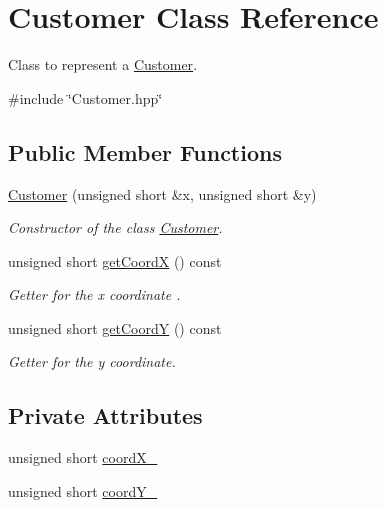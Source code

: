 \hypertarget{classCustomer}{\section{\-Customer \-Class \-Reference}
\label{classCustomer}
}


\-Class to represent a {\ttfamily \hyperlink{classCustomer}{\-Customer}}.  




{\ttfamily \#include \char`\"{}\-Customer.\-hpp\char`\"{}}

\subsection*{\-Public \-Member \-Functions}
\begin{DoxyCompactItemize}
\item 
\hyperlink{classCustomer_ab28c913ea5290b363f0b4157c483e0d6}{\-Customer} (unsigned short \&x, unsigned short \&y)
\begin{DoxyCompactList}\small\item\em \-Constructor of the class {\ttfamily \hyperlink{classCustomer}{\-Customer}}. \end{DoxyCompactList}\item 
unsigned short \hyperlink{classCustomer_abe89000bd8a0fc722b0322a4c9f4a6ad}{get\-Coord\-X} () const 
\begin{DoxyCompactList}\small\item\em \-Getter for the x coordinate . \end{DoxyCompactList}\item 
unsigned short \hyperlink{classCustomer_aa2e162b850ec0f025ce27e57abdc0891}{get\-Coord\-Y} () const 
\begin{DoxyCompactList}\small\item\em \-Getter for the y coordinate. \end{DoxyCompactList}\end{DoxyCompactItemize}
\subsection*{\-Private \-Attributes}
\begin{DoxyCompactItemize}
\item 
unsigned short \hyperlink{classCustomer_a069ea07dbf810380271456fa45e54b48}{coord\-X\-\_\-}
\item 
unsigned short \hyperlink{classCustomer_a752b743018cd6006ecb1d11d6bc6c6a7}{coord\-Y\-\_\-}
\end{DoxyCompactItemize}
